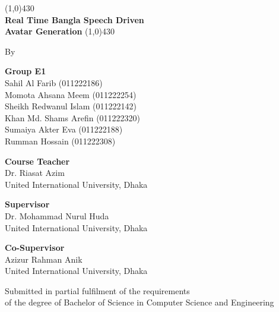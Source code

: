 \begin{titlepage}


\begin{center}
\line(1,0){430}\\
{\Huge \bf Real Time Bangla Speech Driven\\ \vspace{.5em} Avatar Generation}
\line(1,0){430}

\end{center}

\vfill

\begin{center}
By
\end{center}

\begin{center}
{\Large \bf Group E1}\\[0.5em]
Sahil Al Farib (011222186)\\
Momota Ahsana Meem (011222254)\\
Sheikh Redwanul Islam (011222142)\\
Khan Md. Shams Arefin (011222320)\\
Sumaiya Akter Eva (011222188)\\
Rumman Hossain (011222308)
\end{center}

\vfill
\begin{center}
\textbf{Course Teacher}\\
Dr. Riasat Azim\\
United International University, Dhaka
\end{center}

\begin{center}
\textbf{Supervisor}\\
Dr. Mohammad Nurul Huda\\
United International University, Dhaka
\end{center}

\begin{center}
\textbf{Co-Supervisor}\\
Azizur Rahman Anik\\
United International University, Dhaka
\end{center}

\vspace{2em}

\begin{center}
{Submitted in partial fulfilment of the requirements \\of the degree of Bachelor of Science in Computer Science and Engineering}
\end{center}


\end{titlepage}
